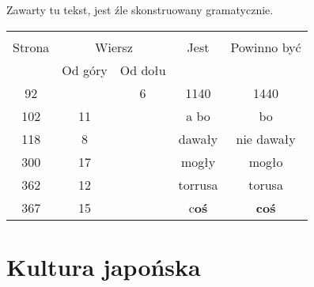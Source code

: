 \documentclass[a4paper,11pt]{article}
\begin{document}
\vspace{\spaceFour}



\start {} Zawarty tu tekst, jest źle skonstruowany
gramatycznie.







\begin{center}

  \begin{tabular}{|c|c|c|c|c|}
    \hline
    & \multicolumn{2}{c|}{} & & \\
    Strona & \multicolumn{2}{c|}{Wiersz} & Jest
                              & Powinno być \\ \cline{2-3}
    & Od góry & Od dołu & & \\
    \hline
    92  & &  6 & 1140 & 1440 \\
    102 & 11 & & a bo & bo \\
    118 &  8 & & dawały & nie dawały \\
    300 & 17 & & mogły & mogło \\
    362 & 12 & & torrusa & torusa \\
    367 & 15 & & c\textbf{oś} & \textbf{coś} \\
    \hline
  \end{tabular}

\end{center}


\vspace{\spaceTwo}










\section{Kultura japońska}

\vspace{\spaceTwo}



\end{document}
